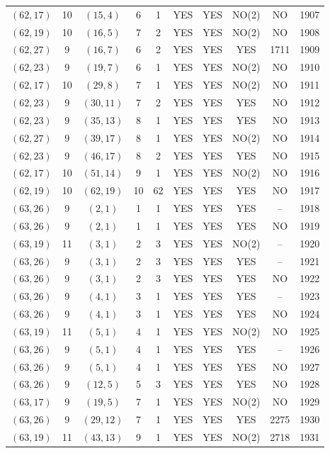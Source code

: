 \begin{longtable}{|c|c|c|c|c|c|c|c|c|c|}
$(62, 17)$ & 10 & $(15, 4)$ & 6 & 1 & YES & YES & NO(2) & NO & 1907\\
$(62, 19)$ & 10 & $(16, 5)$ & 7 & 2 & YES & YES & NO(2) & NO & 1908\\
$(62, 27)$ & 9 & $(16, 7)$ & 6 & 2 & YES & YES & YES & 1711 & 1909\\
$(62, 23)$ & 9 & $(19, 7)$ & 6 & 1 & YES & YES & NO(2) & NO & 1910\\
$(62, 17)$ & 10 & $(29, 8)$ & 7 & 1 & YES & YES & NO(2) & NO & 1911\\
$(62, 23)$ & 9 & $(30, 11)$ & 7 & 2 & YES & YES & YES & NO & 1912\\
$(62, 23)$ & 9 & $(35, 13)$ & 8 & 1 & YES & YES & YES & NO & 1913\\
$(62, 27)$ & 9 & $(39, 17)$ & 8 & 1 & YES & YES & NO(2) & NO & 1914\\
$(62, 23)$ & 9 & $(46, 17)$ & 8 & 2 & YES & YES & YES & NO & 1915\\
$(62, 17)$ & 10 & $(51, 14)$ & 9 & 1 & YES & YES & NO(2) & NO & 1916\\
$(62, 19)$ & 10 & $(62, 19)$ & 10 & 62 & YES & YES & YES & NO & 1917\\
$(63, 26)$ & 9 & $(2, 1)$ & 1 & 1 & YES & YES & YES & -- & 1918\\
$(63, 26)$ & 9 & $(2, 1)$ & 1 & 1 & YES & YES & YES & NO & 1919\\
$(63, 19)$ & 11 & $(3, 1)$ & 2 & 3 & YES & YES & NO(2) & -- & 1920\\
$(63, 26)$ & 9 & $(3, 1)$ & 2 & 3 & YES & YES & YES & -- & 1921\\
$(63, 26)$ & 9 & $(3, 1)$ & 2 & 3 & YES & YES & YES & NO & 1922\\
$(63, 26)$ & 9 & $(4, 1)$ & 3 & 1 & YES & YES & YES & -- & 1923\\
$(63, 26)$ & 9 & $(4, 1)$ & 3 & 1 & YES & YES & YES & NO & 1924\\
$(63, 19)$ & 11 & $(5, 1)$ & 4 & 1 & YES & YES & NO(2) & NO & 1925\\
$(63, 26)$ & 9 & $(5, 1)$ & 4 & 1 & YES & YES & YES & -- & 1926\\
$(63, 26)$ & 9 & $(5, 1)$ & 4 & 1 & YES & YES & YES & NO & 1927\\
$(63, 26)$ & 9 & $(12, 5)$ & 5 & 3 & YES & YES & YES & NO & 1928\\
$(63, 17)$ & 9 & $(19, 5)$ & 7 & 1 & YES & YES & NO(2) & NO & 1929\\
$(63, 26)$ & 9 & $(29, 12)$ & 7 & 1 & YES & YES & YES & 2275 & 1930\\
$(63, 19)$ & 11 & $(43, 13)$ & 9 & 1 & YES & YES & NO(2) & 2718 & 1931\\

\end{longtable}
